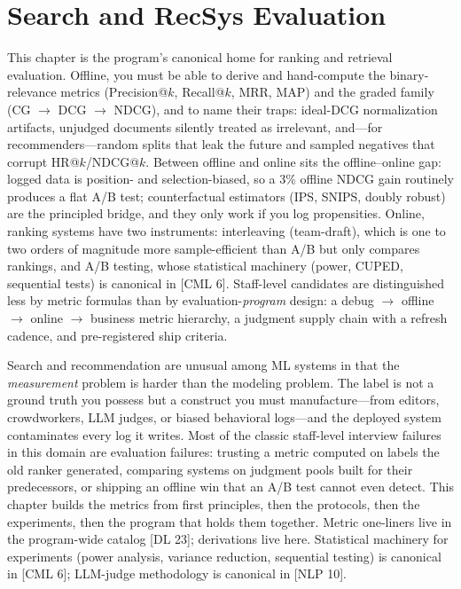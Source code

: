 \chapter{Search and RecSys Evaluation}
\label{sr:chap:evaluation_experimentation}

\begin{tldr}
This chapter is the program's canonical home for ranking and retrieval evaluation. Offline, you must be able to derive and hand-compute the binary-relevance metrics (Precision@$k$, Recall@$k$, MRR, MAP) and the graded family (CG $\to$ DCG $\to$ NDCG), and to name their traps: ideal-DCG normalization artifacts, unjudged documents silently treated as irrelevant, and---for recommenders---random splits that leak the future and sampled negatives that corrupt HR@$k$/NDCG@$k$. Between offline and online sits the offline--online gap: logged data is position- and selection-biased, so a 3\% offline NDCG gain routinely produces a flat A/B test; counterfactual estimators (IPS, SNIPS, doubly robust) are the principled bridge, and they only work if you log propensities. Online, ranking systems have two instruments: interleaving (team-draft), which is one to two orders of magnitude more sample-efficient than A/B but only compares rankings, and A/B testing, whose statistical machinery (power, CUPED, sequential tests) is canonical in [CML 6]. Staff-level candidates are distinguished less by metric formulas than by evaluation-\textit{program} design: a debug $\to$ offline $\to$ online $\to$ business metric hierarchy, a judgment supply chain with a refresh cadence, and pre-registered ship criteria.
\end{tldr}

Search and recommendation are unusual among ML systems in that the \textit{measurement} problem is harder than the modeling problem. The label is not a ground truth you possess but a construct you must manufacture---from editors, crowdworkers, LLM judges, or biased behavioral logs---and the deployed system contaminates every log it writes. Most of the classic staff-level interview failures in this domain are evaluation failures: trusting a metric computed on labels the old ranker generated, comparing systems on judgment pools built for their predecessors, or shipping an offline win that an A/B test cannot even detect. This chapter builds the metrics from first principles, then the protocols, then the experiments, then the program that holds them together. Metric one-liners live in the program-wide catalog [DL 23]; derivations live here. Statistical machinery for experiments (power analysis, variance reduction, sequential testing) is canonical in [CML 6]; LLM-judge methodology is canonical in [NLP 10].

